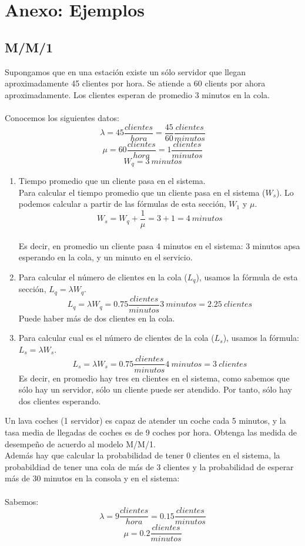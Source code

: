 \section{Anexo: Ejemplos}
\subsection{M/M/1}
Supongamos que en una estación existe un sólo servidor que llegan aproximadamente 45 clientes por hora. Se atiende a 60 clients por ahora aproximadamente. Los clientes esperan de promedio 3 minutos en la cola. \\ \\
Conocemos los siguientes datos:
$$\lambda=45 \frac{clientes}{hora}= \frac{45}{60}\frac{clientes}{minutos}$$
$$ \mu = 60 \frac{clientes}{hora} = 1 \frac{clientes}{minutos} $$
$$ W_q = 3 ~ minutos $$
\begin{enumerate}
	\item Tiempo promedio que un cliente pasa en el sistema. \\
	Para calcular el tiempo promedio que un cliente pasa en el sistema ($W_s$). Lo podemos calcular a partir de las fórmulas de esta sección, $W_1$ y $\mu$.
	$$ W_s=W_q+\frac{1}{\mu}=3+1=4 ~ minutos $$ \\
	Es decir, en promedio un cliente pasa 4 minutos en el sistema: 3 minutos apsa esperando en la cola, y un minuto en el servicio.
	\item Para calcular el número de clientes en la cola ($L_q$), usamos la fórmula de esta sección, $L_q=\lambda W_q$. 
	$$ L_q=\lambda W_q = 0.75 \frac{clientes}{minutos} 3 ~ minutos=2.25 ~ clientes$$
	Puede haber más de dos clientes en la cola.
	\item Para calcular cual es el número de clientes de la cola ($L_s$), usamos la fórmula: $L_s=\lambda W_s$.
	$$L_s=\lambda W_s = 0.75 \frac{clientes}{minutos} 4 ~ minutos=3~ clientes$$
	Es decir, en promedio hay tres en clientes en el sistema, como sabemos que sólo hay un servidor, sólo un cliente puede ser atendido. Por tanto, sólo hay dos clientes esperando.
\end{enumerate}

Un lava coches (1 servidor) es capaz de atender un coche cada 5 minutos, y la tasa media de llegadas de coches es de 9 coches por hora. Obtenga las medida de desempeño de acuerdo al modelo M/M/1. \\
Además hay que calcular la probabilidad de tener 0 clientes en el sistema, la probabildiad de tener una cola de más de 3 clientes y la probabilidad de esperar más de 30 minutos en la consola y en el sistema: \\ \\
Sabemos:
$$ \lambda = 9 \frac{clientes}{hora} = 0.15 \frac{clientes}{minutos} $$
$$ \mu = 0.2 \frac{clientes}{minutos} $$

